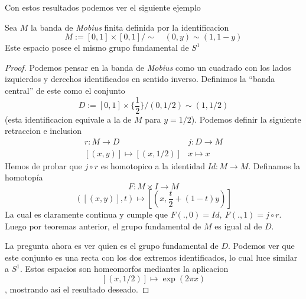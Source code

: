 Con estos resultados podemos ver el siguiente ejemplo
\begin{corolario}
  Sea \(M\) la banda de \emph{Mobius} finita definida por la identificacion
  \[ M := [0,1] \times [0,1] / \sim \quad (0,y) \sim (1, 1 - y) \]
  Este espacio posee el mismo grupo fundamental de \(S^1\)
\end{corolario}
\begin{proof}
  Podemos pensar en la banda de \emph{Mobius} como un cuadrado con los
  lados izquierdos y derechos identificados en sentido inverso.
  Definimos la ``banda central'' de este como el conjunto
  \[ D := [0,1] \times \{\frac 1 2\} / (0, 1 / 2) \sim (1,1 / 2) \]
  (esta identificacion equivale a la de \(M\) para \(y = 1/2\)). Podemos
  definir la siguiente retraccion e inclusion
  \[
    \begin{matrix}
      r : M \to D & j : D \to M \\
      [(x,y)] \mapsto [(x, 1/2)] & x \mapsto x
    \end{matrix}
  \]
  Hemos de probar que \(j \circ r\) es homotopico a la identidad \(Id
  : M \to M\). Definamos la homotopía
  \[ F : M \times I \to M \]
  \[ ([(x,y)], t) \mapsto [(x, \frac t 2 + (1-t) y)] \]
  La cual es claramente continua y cumple que \( F(.,0) = Id,\ F(.,1) =
  j \circ r\). Luego por teoremas anterior, el grupo fundamental de
  \(M\) es igual al de \(D\).

  La pregunta ahora es ver quien es el grupo fundamental de \(D\).
  Podemos ver que este conjunto es una recta con los dos extremos
  identificados, lo cual luce similar a \(S^1\). Estos espacios son
  homeomorfos mediantes la aplicacion \[[(x, 1/2)] \mapsto \exp (2 \pi
  x)\], mostrando asi el resultado deseado.

\end{proof}
